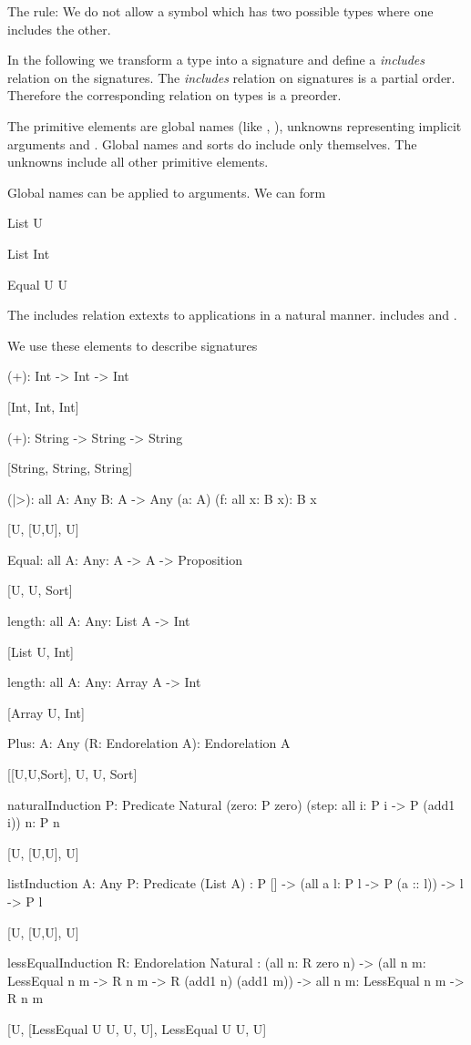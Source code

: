 The rule: We do not allow a symbol which has two possible types where one
includes the other.

In the following we transform a type into a signature and define a
\emph{includes} relation on the signatures. The \emph{includes} relation on
signatures is a partial order. Therefore the corresponding relation on types is
a preorder.

The primitive elements are global names (like , ), unknowns
 representing implicit arguments and . Global names and sorts
do include only themselves. The unknowns include all other primitive elements.

Global names can be applied to arguments. We can form
\begin{alba}
    List U

    List Int

    Equal U U
\end{alba}
%
The includes relation extexts to applications in a natural manner. 
includes  and .

We use these elements to describe signatures
\begin{alba}
    (+): Int -> Int -> Int

        [Int, Int, Int]


    (+): String -> String -> String

        [String, String, String]


    (|>): all {A: Any} {B: A -> Any} (a: A) (f: all {x}: B x): B x

        [U, [U,U], U]


    Equal: all {A: Any}: A -> A -> Proposition

        [U, U, Sort]


    length: all {A: Any}: List A -> Int

        [List U, Int]


    length: all {A: Any}: Array A -> Int

        [Array U, Int]


    Plus: {A: Any} (R: Endorelation A): Endorelation A

        [[U,U,Sort], U, U, Sort]


    naturalInduction {P: Predicate Natural}
        (zero: P zero) (step: all {i}: P i -> P (add1 i))
        {n}: P n

        [U, [U,U], U]


    listInduction {A: Any} {P: Predicate (List A)}
        : P [] -> (all {a l}: P l -> P (a :: l)) -> {l} -> P l

        [U, [U,U], U]


    lessEqualInduction {R: Endorelation Natural}
        :   (all {n}: R zero n)
            -> (all {n m}: LessEqual n m -> R n m -> R (add1 n) (add1 m))
            -> all {n m}: LessEqual n m -> R n m

        [U, [LessEqual U U, U, U], LessEqual U U, U]

\end{alba}




